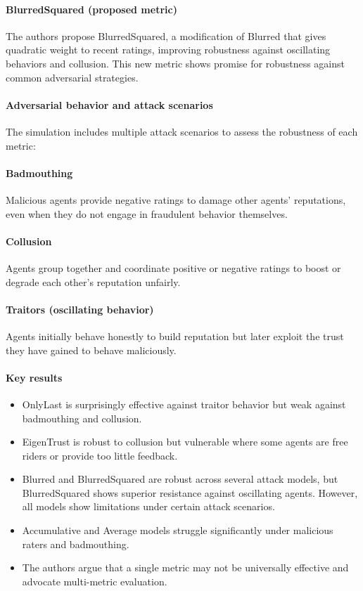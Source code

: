 \documentclass[11pt,a4paper]{article}
\begin{document}
\paragraph{BlurredSquared (proposed metric)}
The authors propose BlurredSquared, a modification of Blurred that gives quadratic weight to recent ratings, improving robustness against oscillating behaviors and collusion. This new metric shows promise for robustness against common adversarial strategies.

\paragraph{Adversarial behavior and attack scenarios}
The simulation includes multiple attack scenarios to assess the robustness of each metric:

\paragraph{Badmouthing}
Malicious agents provide negative ratings to damage other agents' reputations, even when they do not engage in fraudulent behavior themselves.

\paragraph{Collusion}
Agents group together and coordinate positive or negative ratings to boost or degrade each other's reputation unfairly.

\paragraph{Traitors (oscillating behavior)}
Agents initially behave honestly to build reputation but later exploit the trust they have gained to behave maliciously.

\paragraph{Key results}
\begin{itemize}[leftmargin=*]
  \item OnlyLast is surprisingly effective against traitor behavior but weak against badmouthing and collusion.
  \item EigenTrust is robust to collusion but vulnerable where some agents are free riders or provide too little feedback.
  \item Blurred and BlurredSquared are robust across several attack models, but BlurredSquared shows superior resistance against oscillating agents. However, all models show limitations under certain attack scenarios.
  \item Accumulative and Average models struggle significantly under malicious raters and badmouthing.
  \item The authors argue that a single metric may not be universally effective and advocate multi-metric evaluation.
\end{itemize}
\end{document}
